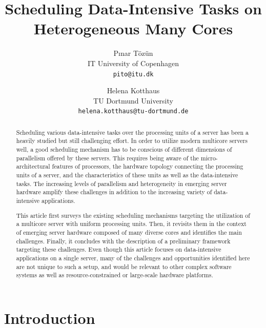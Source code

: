 \documentclass[11pt,dvipdfm]{article}
\begin{document}
\title{Scheduling Data-Intensive Tasks on Heterogeneous Many Cores}

\author{P{\i}nar T\"oz\"un \\ IT University of Copenhagen \\ \texttt{pito@itu.dk}
\and Helena Kotthaus \\ TU Dortmund University \\ \texttt{helena.kotthaus@tu-dortmund.de}}

\maketitle

\begin{abstract}

Scheduling various data-intensive tasks over the processing units of a server
has been a heavily studied but still challenging effort.
In order to utilize modern multicore servers well,
a good scheduling mechanism has to be conscious of different dimensions of parallelism offered by these servers.
This requires being aware of the micro-architectural features of processors,
the hardware topology connecting the processing units of a server,
and the characteristics of these units as well as the data-intensive tasks.
The increasing levels of parallelism and heterogeneity in emerging server hardware
amplify these challenges in addition to the increasing variety of data-intensive applications.

This article first surveys the existing scheduling mechanisms targeting
the utilization of a multicore server with uniform processing units. 
Then, it revisits them in the context of emerging server hardware composed of many diverse cores
and identifies the main challenges.
Finally, it concludes with the description of a preliminary framework targeting these challenges.
Even though this article focuses on data-intensive applications on a single server,
many of the challenges and opportunities identified here are not unique to such a setup,
and would be relevant to other complex software systems as well as
resource-constrained or large-scale hardware platforms. 

\end{abstract}

\section{Introduction}
\label{sec:intro}
\end{document}
